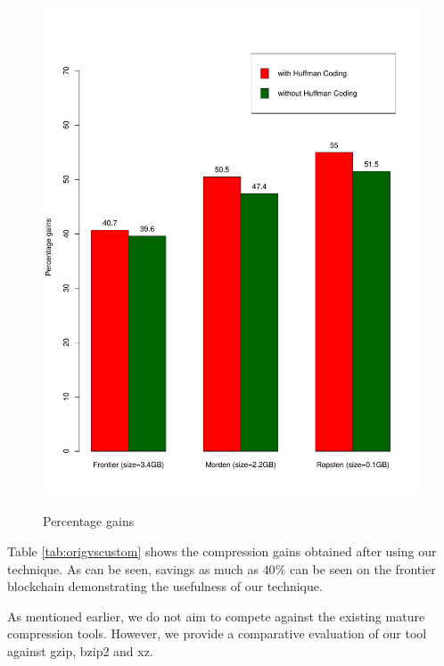 \begin{figure}[!t]
\begin{floatrow}
{	\includegraphics[scale=0.45]{plots/customgains}
}{ \caption{Percentage gains}
\label{fig:origvscustom}
}
\end{floatrow}
\end{figure}

\FloatBarrier
Table \ref{tab:origvscustom} shows the compression gains obtained after using our technique.
As can be seen, savings as much as $40\%$ can be seen on the frontier
blockchain demonstrating the usefulness of our technique.

As mentioned earlier, we do not aim to compete against the existing mature compression tools.
However, we provide a comparative evaluation of our tool against gzip, bzip2 and xz. 

